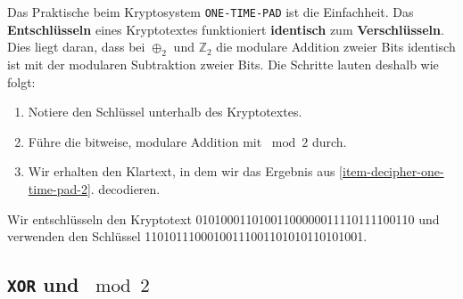 Das Praktische beim Kryptosystem \texttt{ONE-TIME-PAD} ist die Einfachheit. Das \textbf{Entschlüsseln} eines Kryptotextes funktioniert \textbf{identisch} zum \textbf{Verschlüsseln}. Dies liegt daran, dass bei $\oplus_2$ und $\mathbb{Z}_2$ die modulare Addition zweier Bits identisch ist mit der modularen Subtraktion zweier Bits. Die Schritte lauten deshalb wie folgt:

\begin{enumerate}
	\item Notiere den Schlüssel unterhalb des Kryptotextes. 
	\item \label{item-decipher-one-time-pad-2} Führe die bitweise, modulare Addition mit $\bmod 2$ durch.
	\item Wir erhalten den Klartext, in dem wir das Ergebnis aus \ref{item-decipher-one-time-pad-2}. decodieren.
\end{enumerate}
	
\begin{example}
	Wir entschlüsseln den Kryptotext 01010001101001100000011110111100110 und verwenden den Schlüssel 11010111000100111001101010110101001.


\begin{table}[htb]
\centering
{}
\end{table}
\end{example}

\subsection{\texttt{XOR} und $\bmod 2$}

